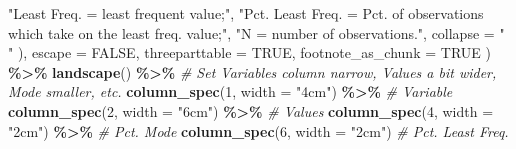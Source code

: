 \documentclass[
]{article}
\newenvironment{Shaded}{\begin{snugshade}}{\end{snugshade}}
\newcommand{\AttributeTok}[1]{\textcolor[rgb]{0.13,0.29,0.53}{#1}}
\newcommand{\CommentTok}[1]{\textcolor[rgb]{0.56,0.35,0.01}{\textit{#1}}}
\newcommand{\ConstantTok}[1]{\textcolor[rgb]{0.56,0.35,0.01}{#1}}
\newcommand{\DecValTok}[1]{\textcolor[rgb]{0.00,0.00,0.81}{#1}}
\newcommand{\FunctionTok}[1]{\textcolor[rgb]{0.13,0.29,0.53}{\textbf{#1}}}
\newcommand{\NormalTok}[1]{#1}
\newcommand{\SpecialCharTok}[1]{\textcolor[rgb]{0.81,0.36,0.00}{\textbf{#1}}}
\newcommand{\StringTok}[1]{\textcolor[rgb]{0.31,0.60,0.02}{#1}}
\begin{document}
\begin{Shaded}
\begin{Highlighting}[]
      \StringTok{"\textasciigrave{}Least Freq.\textquotesingle{} = least frequent value;"}\NormalTok{,}
      \StringTok{"\textasciigrave{}Pct. Least Freq.\textquotesingle{} = Pct. of observations which take on the least freq. value;"}\NormalTok{,}
      \StringTok{"\textasciigrave{}N\textquotesingle{} = number of observations."}\NormalTok{,}
      \AttributeTok{collapse =} \StringTok{" "}
\NormalTok{    ),}
    \AttributeTok{escape =} \ConstantTok{FALSE}\NormalTok{,}
    \AttributeTok{threeparttable =} \ConstantTok{TRUE}\NormalTok{,}
    \AttributeTok{footnote\_as\_chunk =} \ConstantTok{TRUE}
\NormalTok{  ) }\SpecialCharTok{\%\textgreater{}\%} 
  \FunctionTok{landscape}\NormalTok{() }\SpecialCharTok{\%\textgreater{}\%}
  \CommentTok{\# Set Variables column narrow, Values a bit wider, Mode smaller, etc.}
  \FunctionTok{column\_spec}\NormalTok{(}\DecValTok{1}\NormalTok{, }\AttributeTok{width =} \StringTok{"4cm"}\NormalTok{) }\SpecialCharTok{\%\textgreater{}\%} \CommentTok{\# Variable}
  \FunctionTok{column\_spec}\NormalTok{(}\DecValTok{2}\NormalTok{, }\AttributeTok{width =} \StringTok{"6cm"}\NormalTok{) }\SpecialCharTok{\%\textgreater{}\%} \CommentTok{\# Values}
  \FunctionTok{column\_spec}\NormalTok{(}\DecValTok{4}\NormalTok{, }\AttributeTok{width =} \StringTok{"2cm"}\NormalTok{) }\SpecialCharTok{\%\textgreater{}\%} \CommentTok{\# Pct. Mode}
  \FunctionTok{column\_spec}\NormalTok{(}\DecValTok{6}\NormalTok{, }\AttributeTok{width =} \StringTok{"2cm"}\NormalTok{) }\CommentTok{\# Pct. Least Freq.}
\end{Highlighting}
\end{Shaded}
\end{document}

